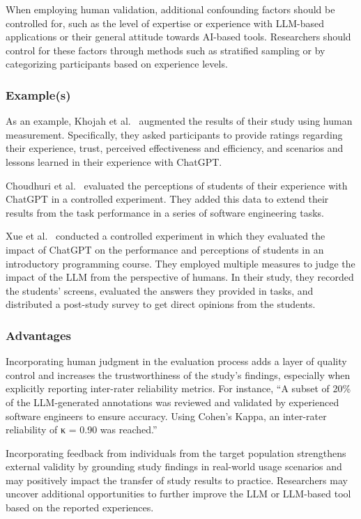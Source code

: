 \documentclass[11pt]{article}
\begin{document}
When employing human validation, additional confounding factors should be controlled for, such as the level of expertise or experience with LLM-based applications or their general attitude towards AI-based tools.
Researchers should control for these factors through methods such as stratified sampling or by categorizing participants based on experience levels.

\subsubsection{Example(s)}

As an example, Khojah et al.~\cite{DBLP:journals/pacmse/KhojahM0N24} augmented the results of their study using human measurement.
Specifically, they asked participants to provide ratings regarding their experience, trust, perceived effectiveness and efficiency, and scenarios and lessons learned in their experience with ChatGPT.

Choudhuri et al.~\cite{DBLP:conf/icse/ChoudhuriLSGS24} evaluated the perceptions of students of their experience with ChatGPT in a controlled experiment.
They added this data to extend their results from the task performance in a series of software engineering tasks.

Xue et al.~\cite{DBLP:conf/icse/XueCBTH24} conducted a controlled experiment in which they evaluated the impact of ChatGPT on the performance and perceptions of students in an introductory programming course.
They employed multiple measures to judge the impact of the LLM from the perspective of humans.
In their study, they recorded the students' screens, evaluated the answers they provided in tasks, and distributed a post-study survey to get direct opinions from the students.


\subsubsection{Advantages}

Incorporating human judgment in the evaluation process adds a layer of quality control and increases the trustworthiness of the study’s findings, especially when explicitly reporting inter-rater reliability metrics. For instance, ``A subset of 20\% of the LLM-generated annotations was reviewed and validated by experienced software engineers to ensure accuracy. Using Cohen's Kappa, an inter-rater reliability of κ = 0.90 was reached.''

Incorporating feedback from individuals from the target population strengthens external validity by grounding study findings in real-world usage scenarios and may positively impact the transfer of study results to practice.
Researchers may uncover additional opportunities to further improve the LLM or LLM-based tool based on the reported experiences.
\end{document}
